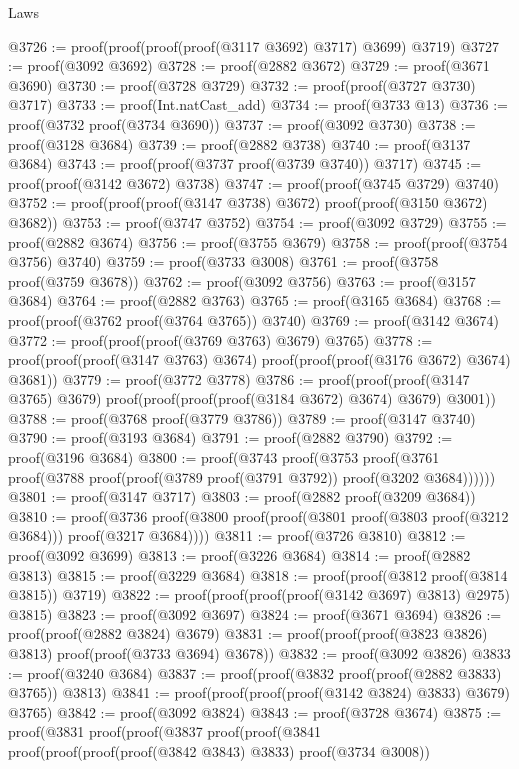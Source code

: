 \begin{lexlean}{Laws}
\begin{coremodule}
@3726 := proof(proof(proof(proof(@3117 @3692) @3717) @3699) @3719)
@3727 := proof(@3092 @3692)
@3728 := proof(@2882 @3672)
@3729 := proof(@3671 @3690)
@3730 := proof(@3728 @3729)
@3732 := proof(proof(@3727 @3730) @3717)
@3733 := proof(Int.natCast_add)
@3734 := proof(@3733 @13)
@3736 := proof(@3732 proof(@3734 @3690))
@3737 := proof(@3092 @3730)
@3738 := proof(@3128 @3684)
@3739 := proof(@2882 @3738)
@3740 := proof(@3137 @3684)
@3743 := proof(proof(@3737 proof(@3739 @3740)) @3717)
@3745 := proof(proof(@3142 @3672) @3738)
@3747 := proof(proof(@3745 @3729) @3740)
@3752 := proof(proof(proof(@3147 @3738) @3672) proof(proof(@3150 @3672) @3682))
@3753 := proof(@3747 @3752)
@3754 := proof(@3092 @3729)
@3755 := proof(@2882 @3674)
@3756 := proof(@3755 @3679)
@3758 := proof(proof(@3754 @3756) @3740)
@3759 := proof(@3733 @3008)
@3761 := proof(@3758 proof(@3759 @3678))
@3762 := proof(@3092 @3756)
@3763 := proof(@3157 @3684)
@3764 := proof(@2882 @3763)
@3765 := proof(@3165 @3684)
@3768 := proof(proof(@3762 proof(@3764 @3765)) @3740)
@3769 := proof(@3142 @3674)
@3772 := proof(proof(proof(@3769 @3763) @3679) @3765)
@3778 := proof(proof(proof(@3147 @3763) @3674) proof(proof(proof(@3176 @3672) @3674) @3681))
@3779 := proof(@3772 @3778)
@3786 := proof(proof(proof(@3147 @3765) @3679)
      proof(proof(proof(proof(@3184 @3672) @3674) @3679) @3001))
@3788 := proof(@3768 proof(@3779 @3786))
@3789 := proof(@3147 @3740)
@3790 := proof(@3193 @3684)
@3791 := proof(@2882 @3790)
@3792 := proof(@3196 @3684)
@3800 := proof(@3743
      proof(@3753
          proof(@3761 proof(@3788 proof(proof(@3789 proof(@3791 @3792)) proof(@3202 @3684))))))
@3801 := proof(@3147 @3717)
@3803 := proof(@2882 proof(@3209 @3684))
@3810 := proof(@3736
      proof(@3800 proof(proof(@3801 proof(@3803 proof(@3212 @3684))) proof(@3217 @3684))))
@3811 := proof(@3726 @3810)
@3812 := proof(@3092 @3699)
@3813 := proof(@3226 @3684)
@3814 := proof(@2882 @3813)
@3815 := proof(@3229 @3684)
@3818 := proof(proof(@3812 proof(@3814 @3815)) @3719)
@3822 := proof(proof(proof(proof(@3142 @3697) @3813) @2975) @3815)
@3823 := proof(@3092 @3697)
@3824 := proof(@3671 @3694)
@3826 := proof(proof(@2882 @3824) @3679)
@3831 := proof(proof(proof(@3823 @3826) @3813) proof(proof(@3733 @3694) @3678))
@3832 := proof(@3092 @3826)
@3833 := proof(@3240 @3684)
@3837 := proof(proof(@3832 proof(proof(@2882 @3833) @3765)) @3813)
@3841 := proof(proof(proof(proof(@3142 @3824) @3833) @3679) @3765)
@3842 := proof(@3092 @3824)
@3843 := proof(@3728 @3674)
@3875 := proof(@3831
      proof(proof(@3837
            proof(proof(@3841
                  proof(proof(proof(proof(@3842 @3843) @3833) proof(@3734 @3008))

\end{coremodule}
\end{lexlean}
